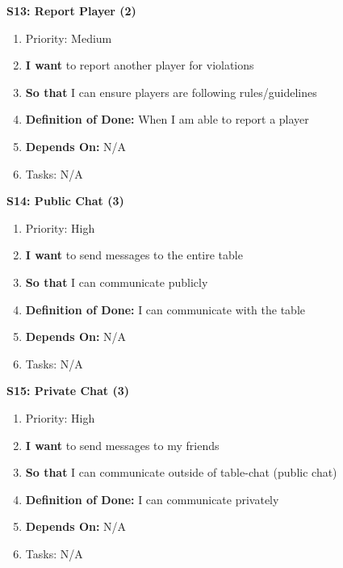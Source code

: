 \textbf{S13: Report Player (2)}
\begin{enumerate}
    \item Priority: Medium
    \item \textbf{I want} to report another player for violations
    \item \textbf{So that} I can ensure players are following rules/guidelines
    \item \textbf{Definition of Done:} When I am able to report a player
    \item \textbf{Depends On:} N/A
    \item Tasks: N/A
\end{enumerate}


\textbf{S14: Public Chat (3)}
\begin{enumerate}
    \item Priority: High
    \item \textbf{I want} to send messages to the entire table
    \item \textbf{So that} I can communicate publicly
    \item \textbf{Definition of Done:} I can communicate with the table
    \item \textbf{Depends On:} N/A
    \item Tasks: N/A
\end{enumerate}


\textbf{S15: Private Chat (3)}
\begin{enumerate}
    \item Priority: High
    \item \textbf{I want} to send messages to my friends
    \item \textbf{So that} I can communicate outside of table-chat (public chat)
    \item \textbf{Definition of Done:} I can communicate privately
    \item \textbf{Depends On:} N/A
    \item Tasks: N/A
\end{enumerate}


